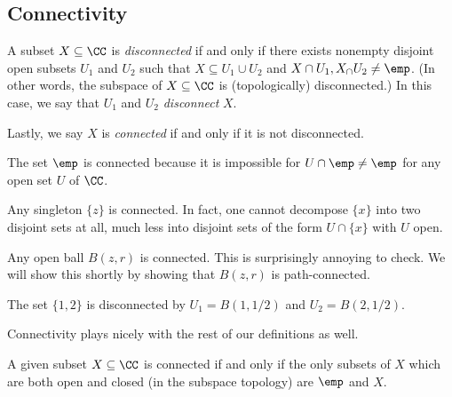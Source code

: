 \subsection{Connectivity}
\begin{definition}[Disconnected]
	A subset $X\subseteq\CC$ is \textit{disconnected} if and only if there exists nonempty disjoint open subsets $U_1$ and $U_2$ such that $X\subseteq U_1\cup U_2$ and $X\cap U_1,X_\cap U_2\ne\emp$. (In other words, the subspace of $X\subseteq\CC$ is (topologically) disconnected.) In this case, we say that $U_1$ and $U_2$ \textit{disconnect} $X$.

	Lastly, we say $X$ is \textit{connected} if and only if it is not disconnected.
\end{definition}
\begin{example}
	The set $\emp$ is connected because it is impossible for $U\cap\emp\ne\emp$ for any open set $U$ of $\CC$.
\end{example}
\begin{example}
	Any singleton $\{z\}$ is connected. In fact, one cannot decompose $\{x\}$ into two disjoint sets at all, much less into disjoint sets of the form $U\cap\{x\}$ with $U$ open.
\end{example}
\begin{ex}
	Any open ball $B(z,r)$ is connected. This is surprisingly annoying to check. We will show this shortly by showing that $B(z,r)$ is path-connected. %
\end{ex}
\begin{example}
	The set $\{1,2\}$ is disconnected by $U_1=B(1,1/2)$ and $U_2=B(2,1/2)$.
\end{example}
Connectivity plays nicely with the rest of our definitions as well.
\begin{lemma}
	A given subset $X\subseteq\CC$ is connected if and only if the only subsets of $X$ which are both open and closed (in the subspace topology) are $\emp$ and $X$.
\end{lemma}
